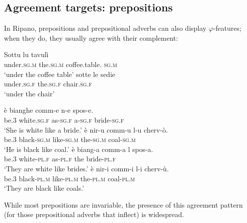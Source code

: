 \documentclass[output=paper
,modfonts
,nonflat]{langsci/langscibook}
\begin{document}
\subsection{Agreement targets: prepositions} \label{sec-dalessandro:1.3}
In Ripano, prepositions and prepositional adverbs can also display $\varphi$-features; when they do, they usually agree with their complement:

\begin{exe}
	\ex \label{ex-dalessandro:6}\citet[309]{Ledgeway2012} \xlist
	\ex 
	\gll Sottu      lu     tavulì \\
	under.\textsc{sg}.\textsc{m}   the.\textsc{sg}.\textsc{m}  coffee.table. \textsc{sg}.\textsc{m}\\
	\glt `under the coffee table' 
	\ex
	\gll  sotte     le     sedie\\
	under.\textsc{sg}.\textsc{f}  the.\textsc{sg}.\textsc{f}  chair.\textsc{sg}.\textsc{f}\\
	\glt `under the chair' 
	\endxlist
\end{exe}
\begin{exe}
	\ex \label{ex-dalessandro:7}\citet[54]{Lambertelli2003} \xlist
	\ex 
	\gll   è   bianghe   comm-e   n-e   spos-e.\\
	be.\textsc{3}  white.\textsc{sg.f} as-\textsc{sg.f}    a-\textsc{sg.f}  bride-\textsc{sg.f}\\
	\glt `She is white like a bride.' 
	\ex
	\gll  è   nir-u     comm-u   l-u     cherv-ò.\\
	be.3  black-\textsc{sg.m} like-\textsc{sg.m} the-\textsc{sg.m} coal-\textsc{sg.m}\\
	\glt `He is black like coal.' 
	\ex
	\gll  è  biang-a    comm-a  l  spos-a.\\
	be.3  white-\textsc{pl.f} as-\textsc{pl.f}    the  bride-\textsc{pl.f}\\
	\glt `They are white like brides.' 
	\ex
	\gll  è   nir-i     comm-i  l-i     cherv-ù.\\
	be.3   black-\textsc{pl.m} like-\textsc{pl.m} the-\textsc{pl.m} coal-\textsc{pl.m}\\
	\glt `They are black like coals.'
	\endxlist
\end{exe}
While most prepositions are invariable, the presence of this agreement pattern (for those prepositional adverbs that inflect) is widespread.
\end{document}
